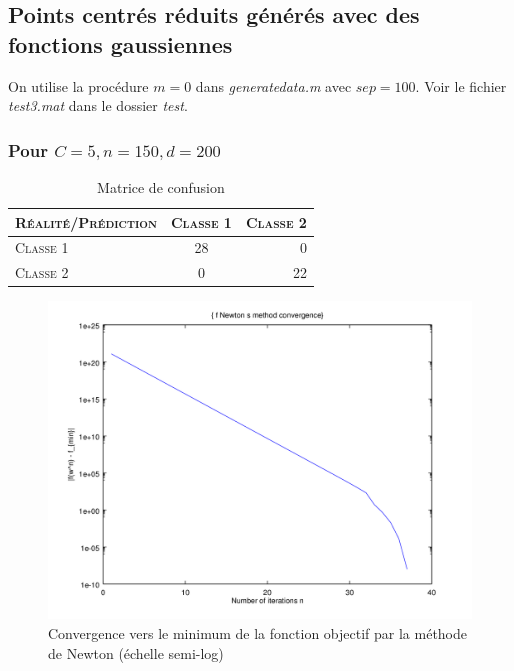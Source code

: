 \documentclass{article}
\begin{document}
\subsection{Points centrés réduits générés avec des fonctions gaussiennes}

On utilise la procédure $m = 0$ dans \emph{generatedata.m} avec $sep=100$. Voir le fichier \emph{test3.mat} dans le dossier \emph{test}. 

\subsubsection{Pour $C=5, n=150, d=200$}

     \begin{table}[H]
       \caption{Matrice de confusion}
       \begin{tabular}{|l|c|r|}
         \hline
         \textsc{Réalité/Prédiction} & \textsc{Classe 1} & \textsc{Classe 2}\\
         \hline
         \textsc{Classe 1} & 28 & 0\\
         \hline
         \textsc{Classe 2} & 0 & 22\\
         \hline
       \end{tabular}
     \end{table}

         \begin{figure}
           \begin{center}
             \includegraphics[scale=0.5]{images/cvnewton3.png}
             \caption{Convergence vers le minimum de la fonction objectif par la méthode de Newton (échelle semi-log)}
           \end{center}
         \end{figure}
\end{document}
